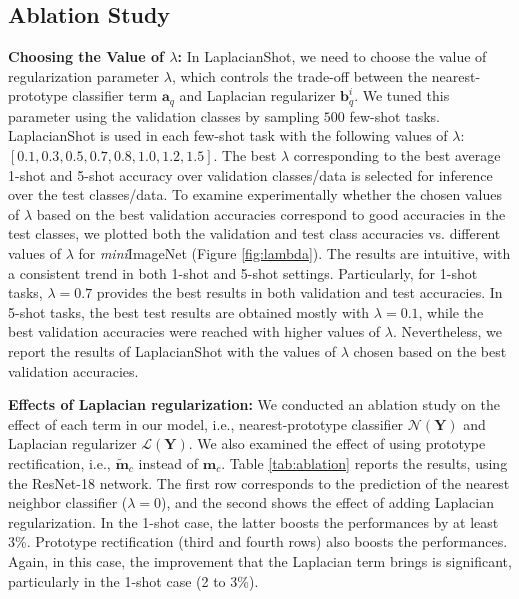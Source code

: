 \documentclass{article}
\newcommand{\Ncal}{\mathcal{N}}
\newcommand{\Lcal}{\mathcal{L}}
\newcommand{\YY}{\mathbf Y}
\newcommand{\mm}{{\mathbf m}}
\begin{document}
\subsection{Ablation Study}
\label{lambda}
\textbf{Choosing the Value of $\lambda$:}
In LaplacianShot, we need to choose the value of regularization parameter $\lambda$, which controls the trade-off between the nearest-prototype classifier term ${\mathbf a}_q$ and Laplacian regularizer ${\mathbf b}_q^i$. We tuned this parameter using the validation classes by sampling $500$ few-shot tasks. LaplacianShot is used in each few-shot task with the following values of $\lambda$: $[0.1,0.3,0.5,0.7,0.8,1.0,1.2,1.5]$. The best $\lambda$ corresponding to the best average 1-shot and 5-shot accuracy over validation classes/data is selected for inference over the test classes/data. To examine experimentally whether the chosen values of $\lambda$ based on the best validation accuracies correspond to good accuracies in the test classes, we plotted both the validation and test class accuracies 
vs. different values of $\lambda$ for \textit{mini}ImageNet (Figure \ref{fig:lambda}). The results are intuitive, with a consistent trend in both 1-shot and 5-shot settings. Particularly, for 1-shot tasks, $\lambda=0.7$ provides the best results in both  validation and test accuracies. In 5-shot tasks, the best test results are obtained mostly with $\lambda=0.1$, while the best validation accuracies were reached with higher values of $\lambda$. Nevertheless, we report the results of LaplacianShot with the values of $\lambda$ chosen based on the best validation accuracies.

\textbf{Effects of Laplacian regularization:}
We conducted an ablation study on the effect of each term in our model, i.e., nearest-prototype classifier $\Ncal(\YY)$ and Laplacian regularizer $\Lcal(\YY)$. We also examined the effect of using prototype rectification, i.e., $\tilde{\mm}_{c}$ instead of $\mm_{c}$.
Table \ref{tab:ablation} reports the results, using the ResNet-18 network. The first row corresponds to the prediction of the nearest neighbor classifier ($\lambda=0$), and the second shows the effect of adding Laplacian regularization. In the 1-shot case, the latter boosts the performances by at least 3\%. Prototype rectification (third and fourth rows) also boosts the performances. Again, in this case, the improvement that the Laplacian term brings is significant, particularly in the 1-shot case (2 to 3\%).
\end{document}

